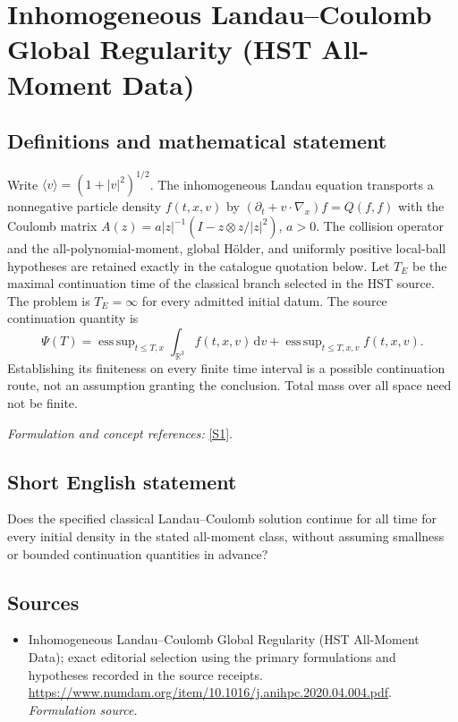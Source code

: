 \documentclass[11pt]{article}
\begin{document}
\section*{\texorpdfstring{Inhomogeneous Landau–Coulomb Global Regularity (HST All-Moment Data)}{Inhomogeneous Landau–Coulomb Global Regularity (HST All-Moment Data)}}\label{179}
\subsection{Definitions and mathematical statement}
Write $\langle v\rangle=(1+|v|^2)^{1/2}$. The inhomogeneous Landau equation transports a nonnegative particle density $f(t,x,v)$ by
$(\partial_t+v\cdot\nabla_x)f=Q(f,f)$ with the Coulomb matrix
$A(z)=a|z|^{-1}(I-z\otimes z/|z|^2)$, $a>0$. The collision operator and the all-polynomial-moment, global H\"older, and uniformly positive local-ball hypotheses are retained exactly in the catalogue quotation below. Let $T_E$ be the maximal continuation time of the classical branch selected in the HST source. The problem is $T_E=\infty$ for every admitted initial datum. The source continuation quantity is
\[
 \Psi(T)=\mathop{\mathrm{ess\,sup}}_{t\le T,x}\int_{{\mathbb{R}}^3}f(t,x,v){\,\mathrm{d}} v
 +\mathop{\mathrm{ess\,sup}}_{t\le T,x,v}f(t,x,v).
\]
Establishing its finiteness on every finite time interval is a possible continuation route, not an assumption granting the conclusion. Total mass over all space need not be finite.
\par\smallskip\textit{Formulation and concept references:} \href{https://www.numdam.org/item/10.1016/j.anihpc.2020.04.004.pdf}{[S1]}.

\subsection{Short English statement}
Does the specified classical Landau–Coulomb solution continue for all time for every initial density in the stated all-moment class, without assuming smallness or bounded continuation quantities in advance?
\subsection{Sources}
\begin{itemize}
\item[S1]Inhomogeneous Landau–Coulomb Global Regularity (HST All-Moment Data); exact editorial selection using the primary formulations and hypotheses recorded in the source receipts.
\url{https://www.numdam.org/item/10.1016/j.anihpc.2020.04.004.pdf}.
\textit{Formulation source.}
\end{itemize}
\end{document}
